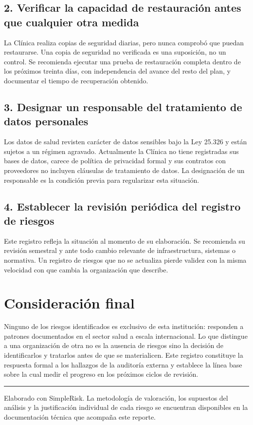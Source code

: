 \documentclass[10pt,a4paper]{article}
\begin{document}
\subsection*{2. Verificar la capacidad de restauración antes que cualquier otra medida}

La Clínica realiza copias de seguridad diarias, pero nunca comprobó que puedan
restaurarse. Una copia de seguridad no verificada es una suposición, no un
control. Se recomienda ejecutar una prueba de restauración completa dentro de los
próximos treinta días, con independencia del avance del resto del plan, y
documentar el tiempo de recuperación obtenido.

\subsection*{3. Designar un responsable del tratamiento de datos personales}

Los datos de salud revisten carácter de datos sensibles bajo la Ley 25.326 y
están sujetos a un régimen agravado. Actualmente la Clínica no tiene registradas
sus bases de datos, carece de política de privacidad formal y sus contratos con
proveedores no incluyen cláusulas de tratamiento de datos. La designación de un
responsable es la condición previa para regularizar esta situación.

\subsection*{4. Establecer la revisión periódica del registro de riesgos}

Este registro refleja la situación al momento de su elaboración. Se recomienda su
revisión semestral y ante todo cambio relevante de infraestructura, sistemas o
normativa. Un registro de riesgos que no se actualiza pierde validez con la misma
velocidad con que cambia la organización que describe.

\section{Consideración final}

Ninguno de los riesgos identificados es exclusivo de esta institución: responden a
patrones documentados en el sector salud a escala internacional. Lo que distingue
a una organización de otra no es la ausencia de riesgos sino la decisión de
identificarlos y tratarlos antes de que se materialicen. Este registro constituye
la respuesta formal a los hallazgos de la auditoría externa y establece la línea
base sobre la cual medir el progreso en los próximos ciclos de revisión.

\vspace{20pt}
\hrule
\vspace{8pt}
{\small\color{gris}
Elaborado con SimpleRisk. La metodología de valoración, los supuestos del
análisis y la justificación individual de cada riesgo se encuentran disponibles
en la documentación técnica que acompaña este reporte.}
\end{document}
